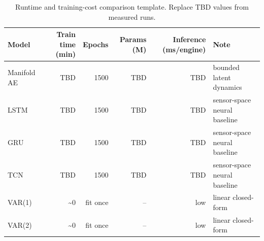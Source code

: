 \begin{table}[t]
\centering
\caption{Runtime and training-cost comparison template. Replace TBD values from measured runs.}
\label{tab:runtime_training_cost}
\begin{tabular}{lrrrrl}
\toprule
Model & Train time (min) & Epochs & Params (M) & Inference (ms/engine) & Note \\
\midrule
Manifold AE & TBD & 1500 & TBD & TBD & bounded latent dynamics \\
LSTM & TBD & 1500 & TBD & TBD & sensor-space neural baseline \\
GRU & TBD & 1500 & TBD & TBD & sensor-space neural baseline \\
TCN & TBD & 1500 & TBD & TBD & sensor-space neural baseline \\
VAR(1) & \textasciitilde 0 & fit once & -- & low & linear closed-form \\
VAR(2) & \textasciitilde 0 & fit once & -- & low & linear closed-form \\
\bottomrule
\end{tabular}
\end{table}